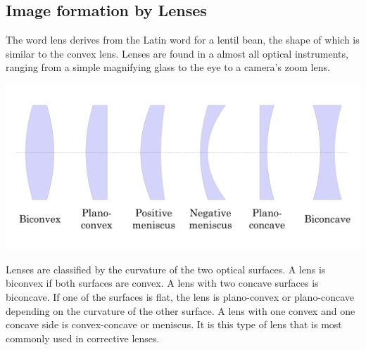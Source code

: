 \documentclass[11pt]{article}
\begin{document}
	 \subsection*{Image formation by Lenses}
	 The word lens derives from the Latin word for a lentil bean, the shape of which is similar to the convex lens. Lenses are found in a almost all optical instruments, ranging from a simple magnifying glass to the eye to a camera’s zoom lens.
	 \begin{center}
	 	\includegraphics[scale=0.3]{lenses}
	 \end{center}
	 Lenses are classified by the curvature of the two optical surfaces. A lens is biconvex if both surfaces are convex. A lens with two concave surfaces is biconcave. If one of the surfaces is flat, the lens is plano-convex or plano-concave depending on the curvature of the other surface. A lens with one convex and one concave side is convex-concave or meniscus. It is this type of lens that is most commonly used in corrective lenses. 
\end{document}
